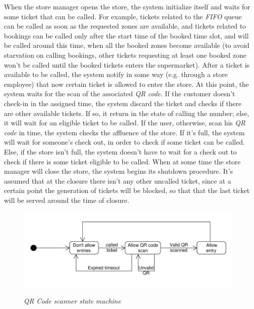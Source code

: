 \documentclass{article}
\begin{document}
		When the store manager opens the store, the system initialize itself and waits for some ticket that can be called. For example, tickets related to the \emph{FIFO} queue can be called as soon as the requested zones are available, and tickets related to bookings can be called only after the start time of the booked time slot, and will be called around this time, when all the booked zones become available (to avoid starvation on calling bookings, other tickets requesting at least one booked zone won't be called until the booked tickets enters the supermarket). After a ticket is available to be called, the system notify in some way (e.g. through a store employee) that now certain ticket is allowed to enter the store. At this point, the system waits for the scan of the associated \emph{QR code}. If the customer doesn't check-in in the assigned time, the system discard the ticket and checks if there are other available tickets. If so, it return in the state of calling the number; else, it will wait for an eligible ticket to be called. If the user, otherwise, scan his \emph{QR code} in time, the system checks the affluence of the store. If it's full, the system will wait for someone's check out, in order to check if some ticket can be called. Else, if the store isn't full, the system doesn't have to wait for a check out to check if there is some ticket eligible to be called. When at some time the store manager will close the store, the system begins its shutdown procedure. It's assumed that at the closure there isn't any other uncalled ticket, since at a certain point the generation of tickets will be blocked, so that that the last ticket will be served around the time of closure.
		
		\bigskip
		
		\begin{figure}[!h]
			
			\centering
			\hspace*{-2cm}\includegraphics[scale=0.7]{StateCharts/qr_scanner_uml.pdf} \\
			\caption{\emph{QR Code scanner state machine}}
			
		\end{figure}
		
\end{document}
